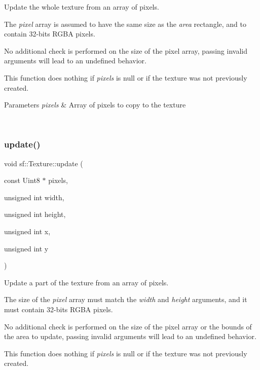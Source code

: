 Update the whole texture from an array of pixels. 

The {\itshape pixel} array is assumed to have the same size as the {\itshape area} rectangle, and to contain 32-\/bits R\+G\+BA pixels.

No additional check is performed on the size of the pixel array, passing invalid arguments will lead to an undefined behavior.

This function does nothing if {\itshape pixels} is null or if the texture was not previously created.


\begin{DoxyParams}{Parameters}
{\em pixels} & Array of pixels to copy to the texture \begin{DoxyVerb}\end{DoxyVerb}
 \\
\hline
\end{DoxyParams}
\mbox{\label{classsf_1_1_texture_a1352d8e16c2aeb4df586ed65dd2c36b9}} 
\subsubsection{\texorpdfstring{update()}{update()}\hspace{0.1cm}{\footnotesize\ttfamily [2/8]}}
{\footnotesize\ttfamily void sf\+::\+Texture\+::update (\begin{DoxyParamCaption}\item[{const Uint8 $\ast$}]{pixels,  }\item[{unsigned int}]{width,  }\item[{unsigned int}]{height,  }\item[{unsigned int}]{x,  }\item[{unsigned int}]{y }\end{DoxyParamCaption})}



Update a part of the texture from an array of pixels. 

The size of the {\itshape pixel} array must match the {\itshape width} and {\itshape height} arguments, and it must contain 32-\/bits R\+G\+BA pixels.

No additional check is performed on the size of the pixel array or the bounds of the area to update, passing invalid arguments will lead to an undefined behavior.

This function does nothing if {\itshape pixels} is null or if the texture was not previously created.


